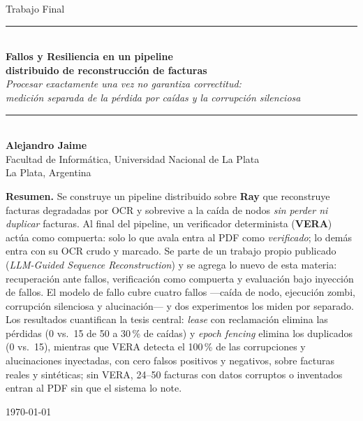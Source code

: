 \documentclass[11pt,a4paper]{article}
\begin{document}
\begin{titlepage}
\centering
\vspace*{2.2cm}
{\color{tinta2}\large Trabajo Final}\\[0.3cm]
{\color{azulvera}\rule{\linewidth}{1.2pt}}\\[0.5cm]
{\Huge\bfseries Fallos y Resiliencia en un pipeline\\[0.2cm]
distribuido de reconstrucción de facturas}\\[0.5cm]
{\large\itshape Procesar \emph{exactamente una vez} no garantiza correctitud:\\
medición separada de la pérdida por caídas y la corrupción silenciosa}\\[0.3cm]
{\color{azulvera}\rule{\linewidth}{1.2pt}}\\[1.4cm]

{\large\bfseries Alejandro Jaime}\\[0.2cm]
{\color{tinta2} Facultad de Informática, Universidad Nacional de La Plata}\\[0.2cm]
{\color{tinta2} La Plata, Argentina}\\[1.6cm]

\begin{minipage}{0.84\linewidth}
\small\color{tinta2}
\textbf{Resumen.} Se construye un pipeline distribuido sobre \textbf{Ray} que reconstruye
facturas degradadas por OCR y sobrevive a la caída de nodos \emph{sin perder ni duplicar}
facturas. Al final del pipeline, un verificador determinista (\textbf{VERA}) actúa como
compuerta: solo lo que avala entra al PDF como \emph{verificado}; lo demás entra con su OCR
crudo y marcado. Se parte de un trabajo propio publicado (\emph{LLM-Guided Sequence
Reconstruction}) y se agrega lo nuevo de esta materia: recuperación ante fallos,
verificación como compuerta y evaluación bajo inyección de fallos. El modelo de fallo cubre
cuatro fallos ---caída de nodo, ejecución zombi, corrupción silenciosa y alucinación--- y
dos experimentos los miden por separado. Los resultados cuantifican la tesis central:
\emph{lease} con reclamación elimina las pérdidas (0 vs.\ 15 de 50 a 30\,\% de caídas) y
\emph{epoch fencing} elimina los duplicados (0 vs.\ 15), mientras que VERA detecta el
100\,\% de las corrupciones y alucinaciones inyectadas, con cero falsos positivos y
negativos, sobre facturas reales y sintéticas; sin VERA, 24--50 facturas con datos corruptos
o inventados entran al PDF sin que el sistema lo note.
\end{minipage}

\vfill
{\color{tinta2} \today}
\end{titlepage}


\end{document}
